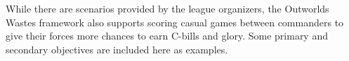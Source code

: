 While there are scenarios provided by the league organizers, the Outworlds Wastes framework also supports scoring casual games between commanders to give their forces more chances to earn C-bills and glory.
Some primary and secondary objectives are included here as examples.
